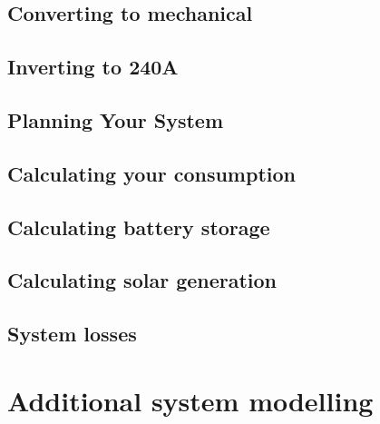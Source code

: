 \documentclass[letterpaper,10pt,english]{sphinxmanual}
\begin{document}
\section{Converting to mechanical}
\label{\detokenize{constructing_a_simple_12v_off-grid_circuit:converting-to-mechanical}}

\section{Inverting to 240A}
\label{\detokenize{constructing_a_simple_12v_off-grid_circuit:inverting-to-240a}}

\section{Planning Your System}
\label{\detokenize{constructing_a_simple_12v_off-grid_circuit:planning-your-system}}

\section{Calculating your consumption}
\label{\detokenize{constructing_a_simple_12v_off-grid_circuit:calculating-your-consumption}}

\section{Calculating battery storage}
\label{\detokenize{constructing_a_simple_12v_off-grid_circuit:calculating-battery-storage}}

\section{Calculating solar generation}
\label{\detokenize{constructing_a_simple_12v_off-grid_circuit:calculating-solar-generation}}

\section{System losses}
\label{\detokenize{constructing_a_simple_12v_off-grid_circuit:system-losses}}

\chapter{Additional system modelling}
\label{\detokenize{additional_system_modelling:additional-system-modelling}}\label{\detokenize{additional_system_modelling::doc}}
\end{document}
